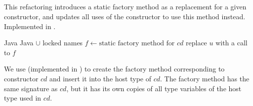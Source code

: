 \subsection{}
This refactoring introduces a static factory method as a replacement for a given constructor, and updates all uses of the constructor to use this method instead. Implemented in .

\begin{algorithm}
\caption{$\refactoring{Introduce Factory}(cd : \type{ConstructorDecl})$}
\begin{algorithmic}[1]
\REQUIRE Java
\ENSURE Java $\cup$ locked names
\medskip
\STATE $f \leftarrow \text{static factory method for $cd$}$
    \STATE replace $u$ with a call to $f$
  \ENDIF
\ENDFOR
\end{algorithmic}
\end{algorithm}

We use  (implemented in ) to create the factory method corresponding to constructor $cd$ and insert it into the host type of $cd$. The factory method has the same signature as $cd$, but it has its own copies of all type variables of the host type used in $cd$.
